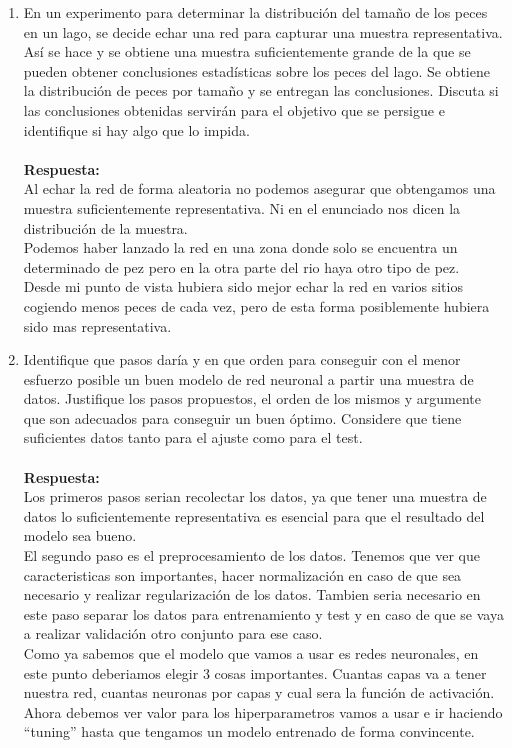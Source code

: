 \documentclass[12pt,a4paper]{article}
\begin{document}
\begin{enumerate}
		\item En un experimento para determinar la distribución del tamaño de los peces en un lago, se
		decide echar una red para capturar una muestra representativa. Así se hace y se obtiene
		una muestra suficientemente grande de la que se pueden obtener conclusiones estadísticas
		sobre los peces del lago. Se obtiene la distribución de peces por tamaño y se entregan las
		conclusiones. Discuta si las conclusiones obtenidas servirán para el objetivo que se persigue
		e identifique si hay algo que lo impida.
		\\\\		\textbf{Respuesta: }\\
		Al echar la red de forma aleatoria  no podemos asegurar que obtengamos una muestra suficientemente representativa. Ni en el enunciado nos dicen la distribución de la muestra.\\ Podemos haber lanzado la red en una zona donde solo se encuentra un determinado de pez pero en la otra parte del rio haya otro tipo de pez. \\ 
		Desde mi punto de vista hubiera sido mejor echar la red en varios sitios cogiendo menos peces de cada vez, pero de esta forma posiblemente hubiera sido mas representativa. 
		
		\item  Identifique que pasos daría y en que orden para conseguir con el menor esfuerzo posible un
		buen modelo de red neuronal a partir una muestra de datos. Justifique los pasos propuestos,
		el orden de los mismos y argumente que son adecuados para conseguir un buen óptimo.
		Considere que tiene suficientes datos tanto para el ajuste como para el test.
		\\\\		\textbf{Respuesta: }\\
		Los primeros pasos serian recolectar los datos, ya que tener una muestra de datos lo suficientemente representativa es esencial para que el resultado del modelo sea bueno.\\
		El segundo paso es el preprocesamiento de los datos. Tenemos que ver que caracteristicas son importantes, hacer normalización en caso de que sea necesario y realizar regularización de los datos. Tambien seria necesario en este paso separar los datos para entrenamiento y test y en caso de que se vaya a realizar validación otro conjunto para ese caso.\\
		Como ya sabemos que el modelo que vamos a usar es redes neuronales, en este punto deberiamos elegir 3 cosas importantes. Cuantas capas va a tener nuestra red, cuantas neuronas por capas y cual sera la función de activación. 
		\\
		Ahora debemos ver valor para los hiperparametros vamos a usar e ir haciendo ``tuning'' hasta que tengamos un modelo entrenado de forma convincente. 
\end{enumerate}
\clearpage
\end{document}
